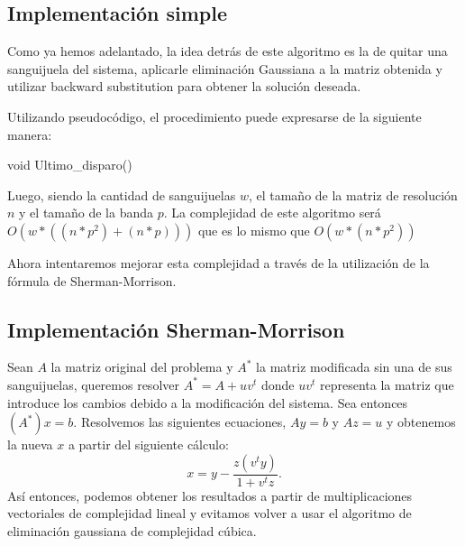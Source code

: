 \subsection{Implementación simple}

Como ya hemos adelantado, la idea detrás de este algoritmo es la de quitar una sanguijuela del sistema, aplicarle eliminación Gaussiana a la matriz obtenida y utilizar backward substitution para obtener la solución deseada.

Utilizando pseudocódigo, el procedimiento puede expresarse de la siguiente manera:

\begin{algorithm}
\begin{algorithmic}[1]\parskip=1mm
\caption{void Ultimo\_disparo()}
\end{algorithmic}
\end{algorithm}

Luego, siendo la cantidad de sanguijuelas $w$, el tamaño de la matriz de resolución $n$ y el tamaño de la banda $p$. La complejidad de este algoritmo será $O(w*((n*p^2) + (n*p)) )$ que es lo mismo que $O(w*(n*p^2))$

Ahora intentaremos mejorar esta complejidad a través de la utilización de la fórmula de Sherman-Morrison.

\subsection{Implementación Sherman-Morrison}

Sean $A$ la matriz original del problema y $A^*$ la matriz modificada sin una de sus sanguijuelas, queremos resolver $A^* = A + uv^t$ donde $uv^t$ representa la matriz que introduce los cambios debido a la modificación del sistema. Sea entonces
$(A^*)x = b$. Resolvemos las siguientes ecuaciones, $Ay = b$ y $Az = u$ y obtenemos la nueva $x$ a partir del siguiente cálculo:
\begin{equation}
x = y - \frac{z(v^ty)}{1+v^tz}.
\end{equation}
Así entonces, podemos obtener los resultados a partir de multiplicaciones vectoriales de complejidad lineal y evitamos volver a usar el algoritmo de eliminación gaussiana de complejidad cúbica.
\\

